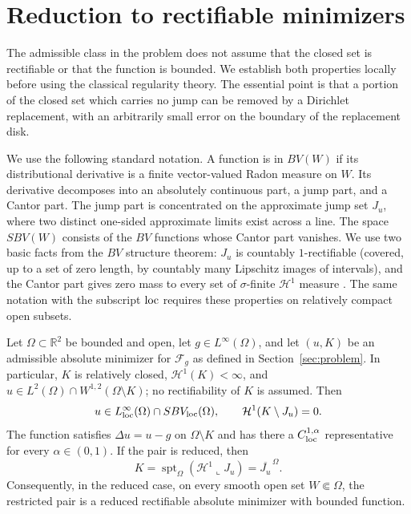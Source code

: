 \section{Reduction to rectifiable minimizers}
\label{sec:initial-reduction}

The admissible class in the problem does not assume that the closed set is
rectifiable or that the function is bounded.  We establish both properties
locally before using the classical regularity theory.  The essential point is
that a portion of the closed set which carries no jump can be removed by a
Dirichlet replacement, with an arbitrarily small error on the boundary of the
replacement disk.

We use the following standard notation.  A function is in $BV(W)$ if its
distributional derivative is a finite vector-valued Radon measure on $W$.
Its derivative decomposes into an absolutely continuous part, a jump part,
and a Cantor part.  The jump part is concentrated on the approximate jump
set $J_u$, where two distinct one-sided approximate limits exist across a
line.  The space $SBV(W)$ consists of the $BV$ functions whose Cantor part
vanishes.  We use two basic facts from the $BV$ structure theorem: $J_u$ is
countably $1$-rectifiable (covered, up to a set of zero length, by
countably many Lipschitz images of intervals), and the Cantor part gives zero mass to every set
of $\sigma$-finite $\mathcal H^1$ measure
\cite[Theorem~3.78 and Proposition~3.92(c)]{ambrosio_fusco_pallara2000}. The same notation with the
subscript ${\rm loc}$ requires these properties on relatively compact
open subsets.

\begin{proposition}
\label{prop:initial-reduction}
Let $\Omega\subset\mathbb R^2$ be bounded and open, let
$g\in L^\infty(\Omega)$, and let $(u,K)$ be an admissible absolute
minimizer for $\mathcal F_g$ as defined in Section~\ref{sec:problem}.  In particular,
$K$ is relatively closed, $\mathcal H^1(K)<\infty$, and
$u\in L^2(\Omega)\cap W^{1,2}(\Omega\setminus K)$; no rectifiability
of $K$ is assumed.  Then
\[
 u\in L^\infty_{\rm loc}(\Omega)\cap SBV_{\rm loc}(\Omega),
 \qquad
 \mathcal H^1(K\setminus J_u)=0.
\]
The function satisfies $\Delta u=u-g$ on $\Omega\setminus K$ and has
there a $C^{1,\alpha}_{\rm loc}$ representative for every $\alpha\in(0,1)$.
If the pair is reduced, then
\begin{equation}
 K=\operatorname{spt}_{\Omega}(\mathcal H^1\!\llcorner J_u)
   =\overline{J_u}^{\,\Omega}.
 \label{eq:jump-support}
\end{equation}
Consequently, in the reduced case, on every smooth open set $W\Subset\Omega$, the restricted
pair is a reduced rectifiable absolute minimizer with bounded function.
\end{proposition}

